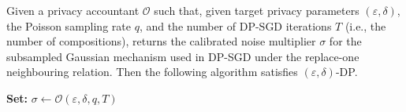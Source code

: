 Given a privacy accountant $\mathcal{O}$ such that, given target privacy parameters $(\varepsilon,\delta)$, the Poisson sampling rate $q$, and the number of DP-SGD iterations $T$ (i.e., the number of compositions), returns the calibrated noise multiplier $\sigma$ for the subsampled Gaussian mechanism used in DP-SGD under the replace-one neighbouring relation. Then the following algorithm satisfies $(\varepsilon,\delta)$-DP.
\begin{algorithm}[H]
\caption{DP-SGD}
\DontPrintSemicolon
{}
\KwIn{iterations $T$, dataset $D=\{x_1,\ldots,x_N\}$, per-example loss $\ell(\theta;x)$, clipping bound $C$, initial weights $\theta_0$, sampling rate $q\in(0,1]$, step size $\eta$, target privacy $(\varepsilon,\delta)$, accountant $\mathcal{O}$}
\BlankLine
\textbf{Set:} $\sigma \leftarrow \mathcal{O}(\varepsilon,\delta,q,T)$ 
\end{algorithm}